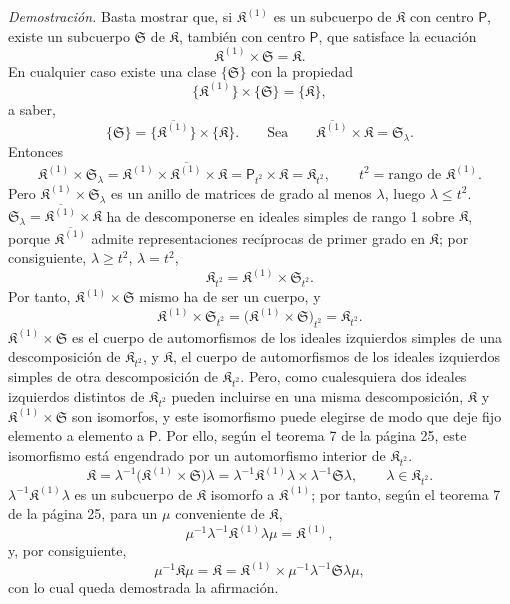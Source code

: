\emph{Demostración.} Basta mostrar que, si \(\mathfrak K^{(1)}\) es un subcuerpo de \(\mathfrak K\) con centro \(\mathsf P\), existe un subcuerpo \(\mathfrak S\) de \(\mathfrak K\), también con centro \(\mathsf P\), que satisface la ecuación
\[
\mathfrak K^{(1)}\times\mathfrak S=\mathfrak K.
\]
En cualquier caso existe una clase \(\{\mathfrak S\}\) con la propiedad
\[
\{\mathfrak K^{(1)}\}\times\{\mathfrak S\}=\{\mathfrak K\},
\]
a saber,
\[
\{\mathfrak S\}=\{\overline{\mathfrak K^{(1)}}\}\times\{\mathfrak K\}.
\qquad
\text{Sea}\qquad
\overline{\mathfrak K^{(1)}}\times\mathfrak K=\mathfrak S_\lambda.
\]
Entonces
\[
\mathfrak K^{(1)}\times\mathfrak S_\lambda
=\mathfrak K^{(1)}\times\overline{\mathfrak K^{(1)}}\times\mathfrak K
=\mathsf P_{t^2}\times\mathfrak K
=\mathfrak K_{t^2},
\qquad
t^2=\text{rango de }\mathfrak K^{(1)}.
\]
Pero \(\mathfrak K^{(1)}\times\mathfrak S_\lambda\) es un anillo de matrices de grado al menos \(\lambda\), luego \(\lambda\leq t^2\). \(\mathfrak S_\lambda=\overline{\mathfrak K^{(1)}}\times\mathfrak K\) ha de descomponerse en ideales simples de rango 1 sobre \(\mathfrak K\), porque \(\overline{\mathfrak K^{(1)}}\) admite representaciones recíprocas de primer grado en \(\mathfrak K\); por consiguiente, \(\lambda\geq t^2\), \(\lambda=t^2\),
\[
\mathfrak K_{t^2}=\mathfrak K^{(1)}\times\mathfrak S_{t^2}.
\]
Por tanto, \(\mathfrak K^{(1)}\times\mathfrak S\) mismo ha de ser un cuerpo, y
\[
\mathfrak K^{(1)}\times\mathfrak S_{t^2}
=\bigl(\mathfrak K^{(1)}\times\mathfrak S\bigr)_{t^2}
=\mathfrak K_{t^2}.
\]
\(\mathfrak K^{(1)}\times\mathfrak S\) es el cuerpo de automorfismos de los ideales izquierdos simples de una descomposición de \(\mathfrak K_{t^2}\), y \(\mathfrak K\), el cuerpo de automorfismos de los ideales izquierdos simples de otra descomposición de \(\mathfrak K_{t^2}\). Pero, como cualesquiera dos ideales izquierdos distintos de \(\mathfrak K_{t^2}\) pueden incluirse en una misma descomposición, \(\mathfrak K\) y \(\mathfrak K^{(1)}\times\mathfrak S\) son isomorfos, y este isomorfismo puede elegirse de modo que deje fijo elemento a elemento a \(\mathsf P\). Por ello, según el teorema 7 de la página 25, este isomorfismo está engendrado por un automorfismo interior de \(\mathfrak K_{t^2}\).
\[
\mathfrak K
=\lambda^{-1}\bigl(\mathfrak K^{(1)}\times\mathfrak S\bigr)\lambda
=\lambda^{-1}\mathfrak K^{(1)}\lambda\times\lambda^{-1}\mathfrak S\lambda,
\qquad
\lambda\in\mathfrak K_{t^2}.
\]
\(\lambda^{-1}\mathfrak K^{(1)}\lambda\) es un subcuerpo de \(\mathfrak K\) isomorfo a \(\mathfrak K^{(1)}\); por tanto, según el teorema 7 de la página 25, para un \(\mu\) conveniente de \(\mathfrak K\),
\[
\mu^{-1}\lambda^{-1}\mathfrak K^{(1)}\lambda\mu=\mathfrak K^{(1)},
\]
y, por consiguiente,
\[
\mu^{-1}\mathfrak K\mu
=\mathfrak K
=\mathfrak K^{(1)}\times\mu^{-1}\lambda^{-1}\mathfrak S\lambda\mu,
\]
con lo cual queda demostrada la afirmación.

